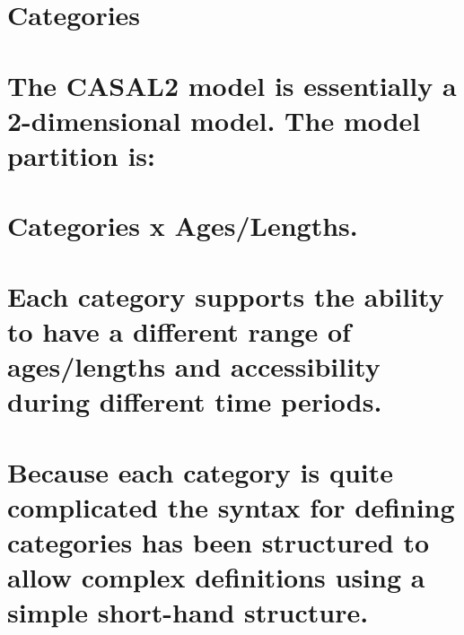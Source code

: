 \documentclass[a4paper,11pt,twoside,pdftex,draft]{article}
\begin{document}
\hypertarget{categories}{%
\section{Categories}\label{categories}}

\hypertarget{the-casal2-model-is-essentially-a-2-dimensional-model.-the-model-partition-is}{%
\section[The CASAL2 model is essentially a 2-dimensional model. The
model partition
is:]{\texorpdfstring{\protect\hypertarget{anchor-3}{}{}The CASAL2 model
is essentially a 2-dimensional model. The model partition
is:}{The CASAL2 model is essentially a 2-dimensional model. The model partition is:}}\label{the-casal2-model-is-essentially-a-2-dimensional-model.-the-model-partition-is}}

\hypertarget{categories-x-ageslengths.}{%
\section{Categories x Ages/Lengths.}\label{categories-x-ageslengths.}}

\hypertarget{each-category-supports-the-ability-to-have-a-different-range-of-ageslengths-and-accessibility-during-different-time-periods.}{%
\section{\texorpdfstring{\hfill\break
Each category supports the ability to have a different range of
ages/lengths and accessibility during different time
periods.}{ Each category supports the ability to have a different range of ages/lengths and accessibility during different time periods.}}\label{each-category-supports-the-ability-to-have-a-different-range-of-ageslengths-and-accessibility-during-different-time-periods.}}

\hypertarget{because-each-category-is-quite-complicated-the-syntax-for-defining-categories-has-been-structured-to-allow-complex-definitions-using-a-simple-short-hand-structure.}{%
\section{\texorpdfstring{\hfill\break
Because each category is quite complicated the syntax for defining
categories has been structured to allow complex definitions using a
simple short-hand
structure.}{ Because each category is quite complicated the syntax for defining categories has been structured to allow complex definitions using a simple short-hand structure.}}\label{because-each-category-is-quite-complicated-the-syntax-for-defining-categories-has-been-structured-to-allow-complex-definitions-using-a-simple-short-hand-structure.}}
\end{document}
